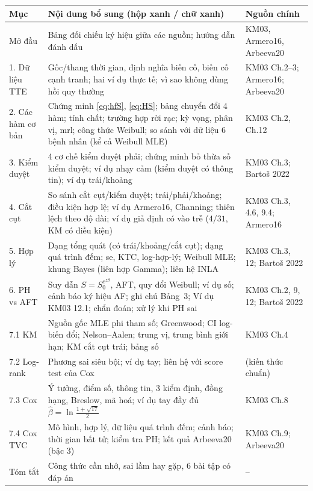 \documentclass[11pt,a4paper,notitlepage]{report}
\renewcommand{\arraystretch}{1.15}
\begin{document}
\begin{center}\small
\renewcommand{\arraystretch}{1.25}
\begin{tabular}{P{2.8cm}P{9cm}P{2.3cm}}
\toprule
Mục & Nội dung bổ sung (hộp xanh / chữ xanh) & Nguồn chính\\
\midrule
Mở đầu & Bảng đối chiếu ký hiệu giữa các nguồn; hướng dẫn đánh dấu & KM03, Armero16, Arbeeva20\\
1. Dữ liệu TTE & Gốc/thang thời gian, định nghĩa biến cố, biến cố cạnh tranh; hai ví dụ thực tế; vì sao không dùng hồi quy thường & KM03 Ch.2--3; Armero16; Arbeeva20\\
2. Các hàm cơ bản & Chứng minh \eqref{eq:hfS}, \eqref{eq:HS}; bảng chuyển đổi 4 hàm; tính chất; trường hợp rời rạc; kỳ vọng, phân vị, mrl; công thức Weibull; so sánh với dữ liệu 6 bệnh nhân (kể cả Weibull MLE) & KM03 Ch.2, Ch.12\\
3. Kiểm duyệt & 4 cơ chế kiểm duyệt phải; chứng minh bỏ thừa số kiểm duyệt; ví dụ nhạy cảm (kiểm duyệt có thông tin); ví dụ trái/khoảng & KM03 Ch.3; Bartoš 2022\\
4. Cắt cụt & So sánh cắt cụt/kiểm duyệt; trái/phải/khoảng; điều kiện hợp lệ; ví dụ Armero16, Channing; thiên lệch theo độ dài; ví dụ giả định có vào trễ ($4/31$, KM có điều kiện) & KM03 Ch.3, 4.6, 9.4; Armero16\\
5. Hợp lý & Dạng tổng quát (có trái/khoảng/cắt cụt); dạng quá trình đếm; se, KTC, log-hợp-lý; Weibull MLE; khung Bayes (liên hợp Gamma); liên hệ INLA & KM03 Ch.3, 12; Bartoš 2022\\
6. PH vs AFT & Suy dẫn $S=S_0^{e^{z\beta}}$, AFT, quy đổi Weibull; ví dụ số; cảnh báo ký hiệu AF; ghi chú Bảng~3; Ví dụ KM03 12.1; chẩn đoán; xử lý khi PH sai & KM03 Ch.2, 9, 12; Bartoš 2022\\
7.1 KM & Nguồn gốc MLE phi tham số; Greenwood; CI log-biến đổi; Nelson--Aalen; trung vị, trung bình giới hạn; KM cắt cụt trái; bảng số & KM03 Ch.4\\
7.2 Log-rank & Phương sai siêu bội; ví dụ tay; liên hệ với score test của Cox & (kiến thức chuẩn)\\
7.3 Cox & Ý tưởng, điểm số, thông tin, 3 kiểm định, đồng hạng, Breslow, mã hoá; ví dụ tay đầy đủ $\hat\beta=\ln\frac{1+\sqrt{17}}2$ & KM03 Ch.8\\
7.4 Cox TVC & Mô hình, hợp lý, dữ liệu quá trình đếm; cảnh báo; thời gian bất tử; kiểm tra PH; kết quả Arbeeva20 (bậc 3) & KM03 Ch.9; Arbeeva20\\
Tóm tắt & Công thức cần nhớ, sai lầm hay gặp, 6 bài tập có đáp án & --\\
\bottomrule
\end{tabular}
\end{center}
\end{document}
